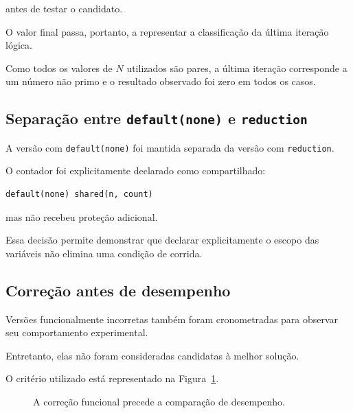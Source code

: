 antes de testar o candidato.

O valor final passa, portanto, a representar a classificação da última
iteração lógica.

Como todos os valores de \(N\) utilizados são pares, a última iteração
corresponde a um número não primo e o resultado observado foi zero em todos
os casos.


\subsection{Separação entre \texttt{default(none)} e \texttt{reduction}}

A versão com \texttt{default(none)} foi mantida separada da versão com
\texttt{reduction}.

O contador foi explicitamente declarado como compartilhado:

\begin{verbatim}
default(none) shared(n, count)
\end{verbatim}

mas não recebeu proteção adicional.

Essa decisão permite demonstrar que declarar explicitamente o escopo das
variáveis não elimina uma condição de corrida.


\subsection{Correção antes de desempenho}

Versões funcionalmente incorretas também foram cronometradas para observar
seu comportamento experimental.

Entretanto, elas não foram consideradas candidatas à melhor solução.

O critério utilizado está representado na Figura~\ref{fig:atvd07-correcao}.

\begin{figure}[htbp]
    \centering
    \caption{A correção funcional precede a comparação de desempenho.}
    \label{fig:atvd07-correcao}
\end{figure}

